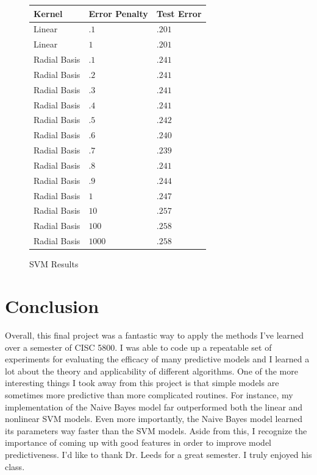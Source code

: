 \documentclass[11pt, oneside]{article}   	%
\begin{document}
\begin{figure}[H]
\caption{SVM Results}

\begin{center}
\begin{tabular}{ l | l || l }
    \hline
    Kernel & Error Penalty & Test Error \\ \hline
    Linear & $.1$ & $.201$   \\ \hline
    Linear & $1$ &  $.201$     \\ \hline
    Radial Basis & $.1$ &  $.241$    \\ \hline
    Radial Basis & $.2$ &  $.241$     \\ \hline
    Radial Basis & $.3$ &  $.241$     \\ \hline
    Radial Basis & $.4$ &  $.241$     \\ \hline
    Radial Basis & $.5$ &  $.242$     \\ \hline
    Radial Basis & $.6$ &  $.240$     \\ \hline
    Radial Basis & $.7$ &  $.239$     \\ \hline
    Radial Basis & $.8$ &  $.241$     \\ \hline
    Radial Basis & $.9$ &  $.244$     \\ \hline
    Radial Basis & $1$ &  $.247$     \\ \hline
    Radial Basis & $10$ &  $.257$     \\ \hline
    Radial Basis & $100$ &  $.258$     \\ \hline
    Radial Basis & $1000$ &  $.258$     \\ \hline
    
\end{tabular}
\end{center}
\end{figure}

\section{Conclusion}

Overall, this final project was a fantastic way to apply the methods I've learned over a semester of CISC 5800. I was able to code up a repeatable set of experiments for evaluating the efficacy of many predictive models and I learned a lot about the theory and applicability of different algorithms. One of the more interesting things I took away from this project is that simple models are sometimes more predictive than more complicated routines. For instance, my implementation of the Naive Bayes model far outperformed both the linear and nonlinear SVM models. Even more importantly, the Naive Bayes model learned its parameters way faster than the SVM models. Aside from this, I recognize the importance of coming up with good features in order to improve model predictiveness. I'd like to thank Dr. Leeds for a great semester. I truly enjoyed his class.
\end{document}
